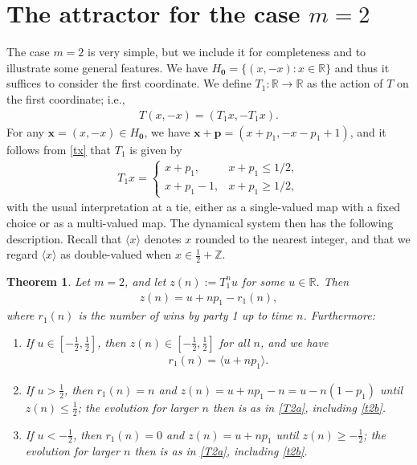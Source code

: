 \documentclass[11pt,reqno,tbtags,a4paper]{amsart}
\numberwithin{equation}{section}
\renewcommand\le{\leq}
\renewcommand\ge{\geq}
\renewcommand\leq{\leqslant}
\renewcommand\geq{\geqslant}
\theoremstyle{plain}%
\newtheorem{theorem}{Theorem}[section]
\theoremstyle{definition}
\theoremstyle{remark}
\newenvironment{romenumerate}[1][-10pt]{%
\addtolength{\leftmargini}{#1}\begin{enumerate}%
 \renewcommand{\labelenumi}{\textup{(\roman{enumi})}}%
 \renewcommand{\theenumi}{\labelenumi}%
%
 }{\end{enumerate}}
\newcounter{cases}
\newcommand\set[1]{\ensuremath{\{#1\}}}
\newcommand\round[1]{\langle#1\rangle}
\newcommand\bbR{\mathbb R}
\newcommand\bbZ{\mathbb Z}
\newcommand\Ho{H_{\0}}
\newcommand\vp{\mathbf{p}}
\newcommand\vx{\mathbf{x}}
\newcommand\0{{\boldsymbol 0}}
\newcommand\1{{\boldsymbol 1}}
\begin{document}
\section{The attractor for the case $m=2$}\label{Sm=2}
The case $m=2$ is very simple, but we include it for completeness and to
illustrate some general features.
We have $\Ho=\set{(x,-x):x\in\bbR}$ and thus it suffices to consider the first
coordinate.
We define $T_1:\bbR\to\bbR$ as the action of $T$ on the first coordinate;
i.e.,  
\begin{align}
  \label{TT1}
T(x,-x)=(T_1x,-T_1x).
\end{align}
For any $\vx=(x,-x)\in\Ho$, we have 
$\vx+\vp=(x+p_1,-x-p_1+1)$, and it follows from \eqref{tx}
that $T_1$ is given by
\begin{align}\label{T1b}
  T_1 x =
  \begin{cases}
    x+p_1,& x+p_1\le 1/2,
\\
x+p_1-1, & x+p_1\ge 1/2,
  \end{cases}
\end{align}
with the usual interpretation at a tie, either as a single-valued map with
a fixed choice or as a multi-valued map.
The dynamical system then has the following description.
Recall that $\round{x}$ denotes $x$ rounded to the nearest integer,
and that we regard $\round x$ as double-valued when $x\in\frac12+\bbZ$.
\begin{theorem}\label{T2}
  Let $m=2$, and let $z(n):=T_1^nu$ for some $u\in\bbR$. %
Then
\begin{align}\label{t2a}
  z(n)=u+np_1-r_1(n),
\end{align}
where $r_1(n)$ is the number of wins by party 1 up to time $n$.
Furthermore:
  \begin{romenumerate}
  \item \label{T2a}
If\/ $u\in[-\frac12,\frac12]$,    
then $z(n)\in[-\frac12,\frac12]$ for all $n$,
and
we have 
\begin{align}\label{t2b}
  r_1(n)=\round{u+np_1}.
\end{align}
\item \label{T2b}
If\/ $u>\frac12$, then $r_1(n)=n$ and $z(n)=u+np_1-n=u-n(1-p_1)$ until $z(n)\le \frac12$;
the evolution for larger $n$ then is as in \ref{T2a}, 
including \eqref{t2b}.

\item \label{T2c}
If\/ $u<-\frac12$, then $r_1(n)=0$ and $z(n)=u+np_1$ until $z(n)\ge -\frac12$;
the evolution for larger $n$ then is as in \ref{T2a},
including \eqref{t2b}.
  \end{romenumerate}
\end{theorem}
\end{document}
